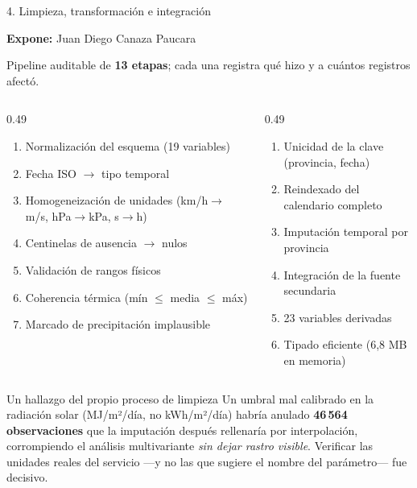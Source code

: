 \documentclass[aspectratio=169,11pt]{beamer}
\newcommand{\ponente}[1]{%
  \begin{flushright}\tiny\textcolor{pnBrandDark}{\textbf{Expone:} #1}\end{flushright}%
  \vspace{-0.9em}%
}
\begin{document}
\begin{frame}{4. Limpieza, transformación e integración}
  \ponente{Juan Diego Canaza Paucara}
  \scriptsize
  Pipeline auditable de \textbf{13 etapas}; cada una registra qué hizo y a cuántos registros afectó.
  \vspace{0.4em}

  \begin{columns}[T]
    \begin{column}{0.49\textwidth}
      \begin{enumerate}\itemsep0.08em
        \item Normalización del esquema (19 variables)
        \item Fecha ISO $\rightarrow$ tipo temporal
        \item \alert{Homogeneización de unidades} (km/h$\rightarrow$m/s, hPa$\rightarrow$kPa, s$\rightarrow$h)
        \item Centinelas de ausencia $\rightarrow$ nulos
        \item Validación de rangos físicos
        \item Coherencia térmica (mín $\leq$ media $\leq$ máx)
        \item Marcado de precipitación implausible
      \end{enumerate}
    \end{column}
    \begin{column}{0.49\textwidth}
      \begin{enumerate}\itemsep0.08em
        \setcounter{enumi}{7}
        \item Unicidad de la clave (provincia, fecha)
        \item Reindexado del calendario completo
        \item Imputación temporal por provincia
        \item \alert{Integración de la fuente secundaria}
        \item 23 variables derivadas
        \item Tipado eficiente (6,8 MB en memoria)
      \end{enumerate}
    \end{column}
  \end{columns}

  \vspace{0.5em}
  \begin{block}{Un hallazgo del propio proceso de limpieza}
    \scriptsize Un umbral mal calibrado en la radiación solar (MJ/m²/día, no kWh/m²/día) habría anulado
    \textbf{46\,564 observaciones} que la imputación después rellenaría por interpolación,
    corrompiendo el análisis multivariante \emph{sin dejar rastro visible}. Verificar las unidades
    reales del servicio —y no las que sugiere el nombre del parámetro— fue decisivo.
  \end{block}
\end{frame}
\end{document}
